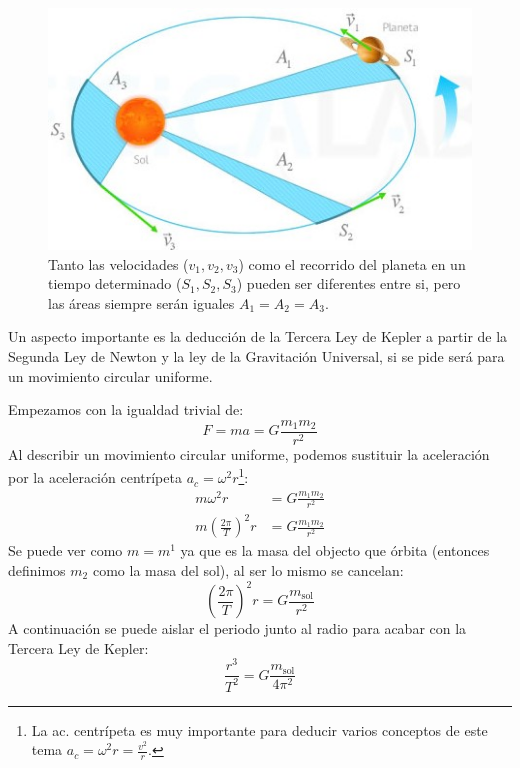 \documentclass[arial,a4paper,print]{article}
\begin{document}
\begin{figure}
	\centering
	\includegraphics[width=0.5\linewidth]{figures/segunda-ley-kepler}
	\caption{Tanto las velocidades ($ v_{1}, v_{2}, v_{3}$) como el recorrido del planeta en un tiempo determinado ($ S_{1}, S_{2}, S_{3}$) pueden ser diferentes entre si, pero las áreas siempre serán iguales $A_{1}=A_{2}=A_{3}$.}
	\label{fig:segunda-ley-kepler}
\end{figure}

Un aspecto importante es la deducción de la Tercera Ley de Kepler a partir de la Segunda Ley de Newton y la ley de la Gravitación Universal, si se pide será para un movimiento circular uniforme. 

Empezamos con la igualdad trivial de:
\begin{equation*}
	F = ma= G\frac{m_{1}m_{2}}{r^2}
\end{equation*}
Al describir un movimiento circular uniforme, podemos sustituir la aceleración por la aceleración centrípeta $a_{c}=\omega^2 r$\footnote{La ac. centrípeta es muy importante para deducir varios conceptos de este tema $ a_{c}= \omega^{2}r =  \frac{v^{2}}{r}$.}:
\begin{align*}
	m\omega^2r &= G\frac{m_{1}m_{2}}{r^2} \\
	m\left(\frac{2\pi}{T}\right)^{2} r&= G\frac{m_{1}m_{2}}{r^2}
\end{align*}
Se puede ver como $m=m^1$ ya que es la masa del objecto que órbita (entonces definimos $m_{2}$ como la masa del sol), al ser lo mismo se cancelan:
\begin{equation*}
	\left(\frac{2\pi}{T}\right)^{2} r = G\frac{m_{\text{sol}}}{r^2}
\end{equation*}
A continuación se puede aislar el periodo junto al radio para acabar con la Tercera Ley de Kepler:
\begin{equation*}
	\frac{r^{3}}{T^{2}} = G\frac{m_{\text{sol}}}{4\pi^{2}}
\end{equation*}
\end{document}
